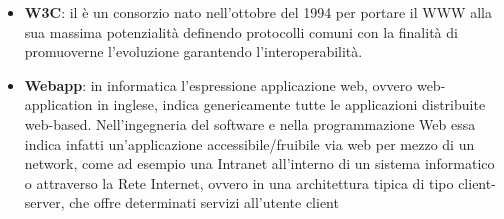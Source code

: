\begin{itemize}
\item[] \textbf{W3C}: il  è un consorzio nato nell'ottobre del 1994 per portare il WWW alla sua massima potenzialità definendo protocolli comuni con la finalità di promuoverne l'evoluzione garantendo l'interoperabilità.
\item[] \textbf{Webapp}: in informatica l'espressione applicazione web, ovvero web-application in inglese, indica genericamente tutte le applicazioni distribuite web-based. Nell'ingegneria del software e nella programmazione Web essa indica infatti un'applicazione accessibile/fruibile via web per mezzo di un network, come ad esempio una Intranet all'interno di un sistema informatico o attraverso la Rete Internet, ovvero in una architettura tipica di tipo client-server, che offre determinati servizi all'utente client
\end{itemize}
